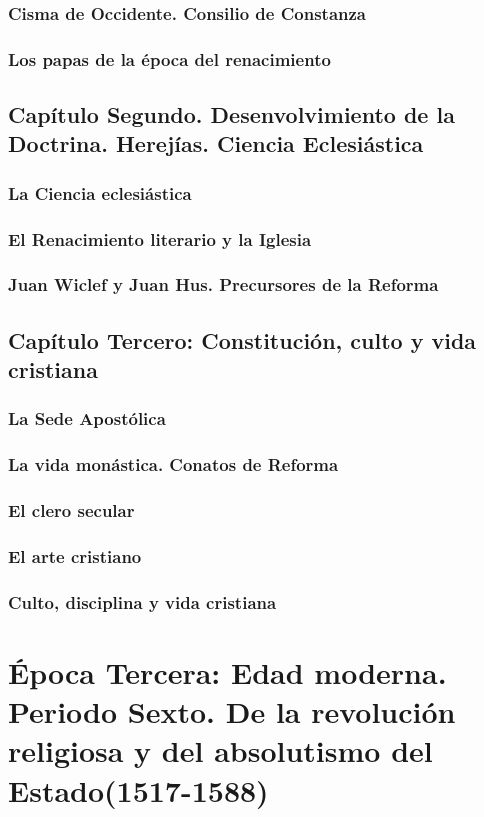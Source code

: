 \raggedbottom{} \documentclass[12pt, a4paper]{book}
\begin{document}
\section{Cisma de Occidente. Consilio de Constanza}
\section{Los papas de la época del renacimiento}
\chapter{Capítulo Segundo. Desenvolvimiento de la Doctrina. Herejías. Ciencia Eclesiástica}
\section{La Ciencia eclesiástica}
\section{El Renacimiento literario y la Iglesia}
\section{Juan Wiclef y Juan Hus. Precursores de la Reforma}
\chapter{Capítulo Tercero: Constitución, culto y vida cristiana}
\section{La Sede Apostólica}
\section{La vida monástica. Conatos de Reforma}
\section{El clero secular}
\section{El arte cristiano}
\section{Culto, disciplina y vida cristiana}
\part{Época Tercera: Edad moderna. Periodo Sexto. De la revolución religiosa y del absolutismo del Estado(1517-1588)}
\end{document}

